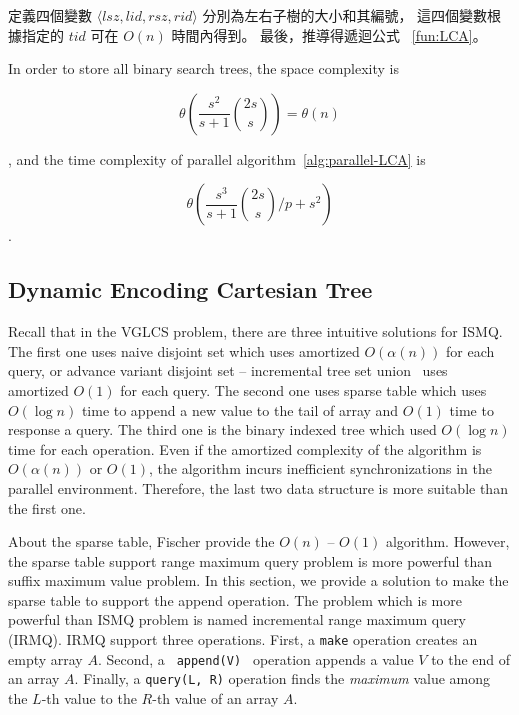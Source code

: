 定義四個變數 $\langle\mathit{lsz},\mathit{lid},\mathit{rsz},\mathit{rid}\rangle$ 分別為左右子樹的大小和其編號，
這四個變數根據指定的 $\mathit{tid}$ 可在 $O(n)$ 時間內得到。
最後，推導得遞迴公式 ~\ref{fun:LCA}。 
\fi



In order to store all binary search trees, the space complexity is 

\begin{equation}
\theta\left(\frac{s^2}{s+1} \binom{2s}{s}\right) = \theta\left(n\right)
\end{equation}

, and the time complexity of parallel algorithm~\ref{alg:parallel-LCA}
is

\begin{equation}
\theta\left(\frac{s^3}{s+1} \binom{2s}{s} \bigg/ p + s^2 \right)
\end{equation}.

\iffalse
為記錄所有的二元搜尋樹的 LCA，空間消耗 $\theta\left(\frac{s^2}{s+1} \binom{2s}{s}\right) = \theta\left(n\right)$；
其平行算法 \ref{alg:parallel-LCA} 的時間複雜度如下：

\begin{equation}
\theta\left(\frac{s^3}{s+1} \binom{2s}{s} \bigg/ p + s^2 \right)
\end{equation}.
\fi



\subsection{Dynamic Encoding Cartesian Tree}

Recall that in the VGLCS problem, there are three intuitive solutions
for ISMQ.  The first one uses naive disjoint set which uses amortized
$O(\alpha(n))$ for each query, or advance variant disjoint set --
incremental tree set union~\cite{Gabow1983ALA} uses amortized $O(1)$ for
each query.  The second one uses sparse table which uses $O(\log n)$
time to append a new value to the tail of array and $O(1)$ time to
response a query.  The third one is the binary indexed tree which used
$O(\log n)$ time for each operation.   Even if the amortized complexity
of the algorithm is $O(\alpha(n))$ or $O(1)$, the algorithm incurs
inefficient synchronizations in the parallel environment. Therefore, the
last two data structure is more suitable than the first one.

About the sparse table, Fischer provide the $O(n)$ -- $O(1)$ algorithm.
However, the sparse table support range maximum query problem is more
powerful than suffix maximum value problem.  In this section, we provide
a solution to make the sparse table to support the append operation. The
problem which is more powerful than ISMQ problem is named incremental
range maximum query (IRMQ).  IRMQ support three operations.  First, a
{\tt make} operation creates an empty array $A$.  Second, a {\tt
append(V) } operation appends a value $V$ to the end of an array $A$.
Finally, a {\tt query(L, R)} operation finds the {\em maximum} value
among the $L$-th value to the $R$-th value of an array $A$.

